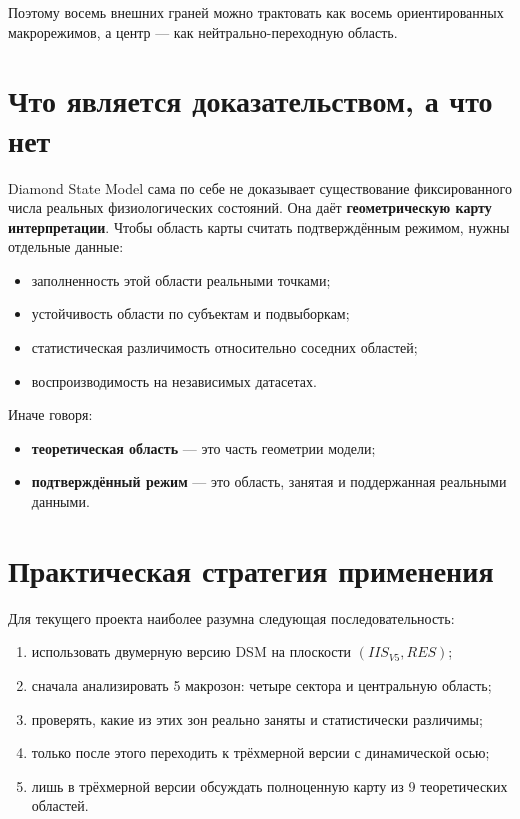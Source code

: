 \documentclass[12pt,a4paper]{article}
\begin{document}
Поэтому восемь внешних граней можно трактовать как восемь ориентированных макрорежимов, а центр --- как нейтрально-переходную область.

\section{Что является доказательством, а что нет}
Diamond State Model сама по себе не доказывает существование фиксированного числа реальных физиологических состояний. Она даёт \textbf{геометрическую карту интерпретации}. Чтобы область карты считать подтверждённым режимом, нужны отдельные данные:
\begin{itemize}[leftmargin=1.25cm]
    \item заполненность этой области реальными точками;
    \item устойчивость области по субъектам и подвыборкам;
    \item статистическая различимость относительно соседних областей;
    \item воспроизводимость на независимых датасетах.
\end{itemize}

Иначе говоря:
\begin{itemize}[leftmargin=1.25cm]
    \item \textbf{теоретическая область} --- это часть геометрии модели;
    \item \textbf{подтверждённый режим} --- это область, занятая и поддержанная реальными данными.
\end{itemize}

\section{Практическая стратегия применения}
Для текущего проекта наиболее разумна следующая последовательность:
\begin{enumerate}[leftmargin=1.25cm]
    \item использовать двумерную версию DSM на плоскости $(IIS_{V5}, RES)$;
    \item сначала анализировать 5 макрозон: четыре сектора и центральную область;
    \item проверять, какие из этих зон реально заняты и статистически различимы;
    \item только после этого переходить к трёхмерной версии с динамической осью;
    \item лишь в трёхмерной версии обсуждать полноценную карту из 9 теоретических областей.
\end{enumerate}
\end{document}
